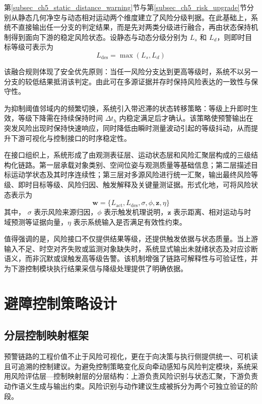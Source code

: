 第\ref{subsec_ch5_static_distance_warning}节与第\ref{subsec_ch5_risk_upgrade}节分别从静态几何净空与动态相对运动两个维度建立了风险分级判据。在此基础上，系统不直接输出任一分支的判定结果，而是先对两类分级进行融合，再由状态保持机制得到面向下游的稳定风险状态。设静态与动态分级分别为 $L_s$ 和 $L_d$，则即时目标等级可表示为
\begin{equation}
L_{\mathrm{des}}=\max(L_s,L_d)
\end{equation}

该融合规则体现了安全优先原则：当任一风险分支达到更高等级时，系统不以另一分支的较低结果抵消该判定。由此可在多源证据并存时保持风险表达的一致性与保守性。

为抑制阈值邻域内的频繁切换，系统引入带迟滞的状态转移策略：等级上升即时生效，等级下降需在持续保持时间 $\Delta t_h$ 内稳定满足后才确认。该策略使预警输出在突发风险出现时保持快速响应，同时降低由瞬时测量波动引起的等级抖动，从而提升下游可视化与控制接口的时序稳定性。

在接口组织上，系统形成了由观测表征层、运动状态层和风险汇聚层构成的三级结构化链路。第一层承载对象类别、空间位姿与观测质量等基础信息；第二层描述目标运动学状态及其时序连续性；第三层对多源风险进行统一汇聚，输出最终风险等级、即时目标等级、风险归因、触发解释及关键量测证据。形式化地，可将风险状态表示为
\begin{equation}
\mathbf{w}=\{L_{\mathrm{act}},L_{\mathrm{des}},\sigma,\phi,\mathbf{z},\eta\}
\end{equation}
其中， $\sigma$ 表示风险来源归因，$\phi$ 表示触发机理说明，$\mathbf{z}$ 表示距离、相对运动与时域预测等证据向量，$\eta$ 表示系统输入是否满足有效性约束。

值得强调的是，风险接口不仅提供结果等级，还提供触发依据与状态质量。当上游输入不足、时空对齐失败或监测对象缺失时，系统显式输出未就绪状态及对应诊断语义，而非沉默或误触发高等级告警。该机制增强了链路可解释性与可验证性，并为下游控制模块执行结果采信与降级处理提供了明确依据。

\section{避障控制策略设计}\label{sec_ch5_avoidance_design}

\subsection{分层控制映射框架}\label{subsec_ch5_closed_loop_arch}

预警链路的工程价值不止于风险可视化，更在于向决策与执行侧提供统一、可机读且可追溯的控制建议。为避免控制策略变化反向牵动感知与风险判定模块，系统采用风险评估层—控制映射层的分层结构：上游负责风险识别与状态汇聚，下游负责动作语义生成与输出约束。风险识别与动作建议生成被拆分为两个可独立验证的阶段。

